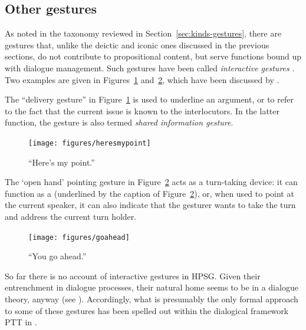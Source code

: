 \documentclass[output=paper,biblatex,babelshorthands,newtxmath,draftmode,colorlinks,citecolor=brown]{langscibook}
\begin{document}
\subsection{Other gestures}
\label{sec:other-gestures}

\largerpage
{}
As noted in the taxonomy reviewed in Section~\ref{sec:kinds-gestures}, there are gestures that, unlike the deictic and iconic ones discussed in the previous sections, do not contribute to propositional content, but serve functions bound up with dialogue management.
%
Such gestures have been called \emph{interactive gestures} \citep{Bavelas:Chovil:Lawrie:Wade:1992}.
%
Two examples are given in Figures~\ref{fig:mypoint} and~\ref{fig:yourturn}, which have been discussed by \citet{Bavelas:Chovil:Coates:Roe:1995}.


The \enquote{delivery gesture} in Figure~\ref{fig:mypoint} is used to underline an argument, or to refer to the fact that the current issue is known to the interlocutors. 
%
In the latter function, the gesture is also termed \emph{shared information gesture}.

\begin{figure}
  \centering
  \texttt{[image: figures/heresmypoint]}
\caption{\enquote{Here's my point.}}
\label{fig:mypoint}
\end{figure}


The \enquote*{open hand} pointing gesture in Figure~\ref{fig:yourturn} acts as a turn-taking device: it can function as a  (underlined by the caption of Figure~\ref{fig:yourturn}), or, when used to point at the current speaker, it can also indicate that the gesturer wants to take the turn and address the current turn holder.

\begin{figure}
  \centering
  \texttt{[image: figures/goahead]}
\caption{\enquote{You go ahead.}}
\label{fig:yourturn}
\end{figure}

So far there is no account of interactive gestures in HPSG. 
%
Given their entrenchment in dialogue processes, their natural home seems to be in a dialogue theory, anyway (see ).
%
Accordingly, what is presumably the only formal approach to some of these gestures has been spelled out within the dialogical framework PTT in \citet{Rieser:Poesio:2009}.
\end{document}
